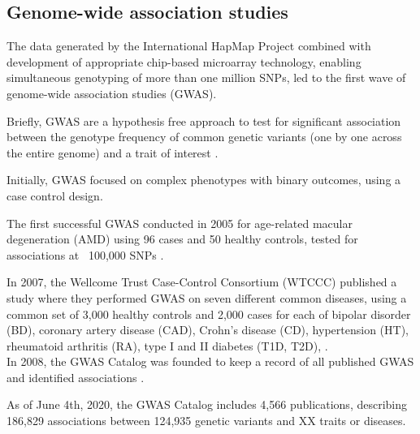 
\subsection{Genome-wide association studies}

The data generated by the International HapMap Project combined with development of appropriate chip-based microarray technology, enabling simultaneous genotyping of more than one million SNPs, led to the first wave of genome-wide association studies (GWAS).

Briefly, GWAS are a hypothesis free approach to test for significant association between the genotype frequency of common genetic variants (one by one across the entire genome) and a trait of interest \cite{mccarthy2008genome}. 

Initially, GWAS focused on complex phenotypes with binary outcomes, using a case control design. 

The first successful GWAS conducted in 2005 for age-related macular degeneration (AMD) using 96 cases and 50 healthy controls, tested for associations at ~100,000 SNPs \cite{klein2005complement}. 

In 2007, the Wellcome Trust Case-Control Consortium (WTCCC) published a study where they performed GWAS on seven different common diseases, using a common set of 3,000 healthy controls and 2,000 cases for each of bipolar disorder (BD), coronary artery disease (CAD), Crohn's disease (CD), hypertension (HT), rheumatoid arthritis (RA), type I and II diabetes (T1D, T2D), \cite{wellcome2007genome}.\\ 

In 2008, the GWAS Catalog was founded to keep a record of all published GWAS and identified associations \cite{}.

\cite{welter2014nhgri}

As of June 4th, 2020, the GWAS Catalog includes 4,566 publications, describing 186,829 associations between 124,935 genetic variants and XX traits or diseases.




